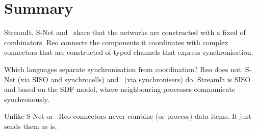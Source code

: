     \section{Summary}
StreamIt, S-Net and \ak\ share that the networks are constructed with a fixed of combinators. Reo connects the components it coordinates with complex connectors that are constructed of typed channels that express synchronisation.

Which languages separate synchronisation from coordination?
Reo does not.
S-Net (via SISO and synchrocells) and \ak\ (via synchronisers) do. 
StreamIt is SISO and based on the SDF model, where neighbouring processes communicate synchronously.

Unlike S-Net or \ak\, Reo connectors never combine (or process) data items. It just sends them as is.

